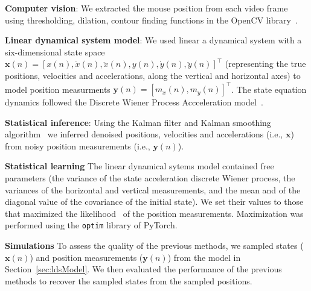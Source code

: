 
\noindent\textbf{Computer vision}: 
%
We extracted the mouse position from each video frame using thresholding,
dilation, contour finding functions in the OpenCV library~\cite{openCV}.

\noindent\textbf{Linear dynamical system model}:
%
We used linear a dynamical system with a six-dimensional state space
$\mathbf{x}(n)=[x(n), \dot{x}(n), \ddot{x}(n), y(n), \dot{y}(n),
\ddot{y}(n)]^\intercal$ (representing the true positions, velocities and
accelerations, along the vertical and horizontal axes)
to model position measurments $\mathbf{y}(n)=[m_x(n), m_y(n)]^\intercal$.
The state equation dynamics followed
the Discrete Wiener Process Accceleration model~\cite{barShalomEtAl01}.

\noindent\textbf{Statistical inference}:
%
Using the Kalman filter and Kalman smoothing algorithm~\cite{kalman61} we
inferred denoised positions, velocities and accelerations (i.e., $\mathbf{x}$)
from noisy position measurements (i.e., $\mathbf{y}(n)$).

\noindent\textbf{Statistical learning}
%
The linear dynamical sytems model contained free parameters (the variance of
the state acceleration discrete Wiener process, the variances of the horizontal
and vertical measurements, and the mean and of the diagonal value of the
covariance of the initial state). We set their values to those that maximized
the likelihood~\cite{shumwayAndStoffer16} of the position measurements.
Maximization was performed using the \texttt{optim} library of
PyTorch\cite{pytorch}.

\noindent\textbf{Simulations}
%
To assess the quality of the previous methods, we sampled states
($\mathbf{x}(n)$) and position measurements ($\mathbf{y}(n)$) from the model in
Section~\ref{sec:ldsModel}. We then evaluated the performance of the previous
methods to recover the sampled states from the sampled positions.
